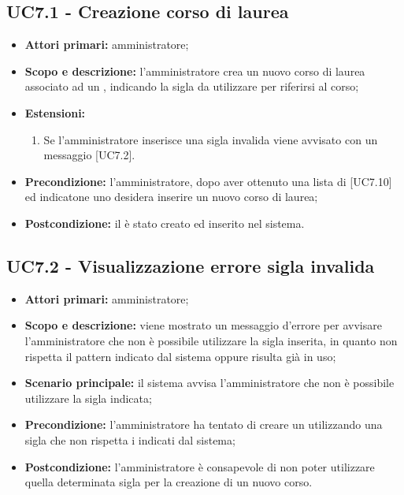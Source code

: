 \documentclass[AnalisiDeiRequisiti.tex]{subfiles}
\begin{document}
\subsection{UC7.1 - Creazione corso di laurea}
\begin{itemize}
	\item \textbf{Attori primari:} amministratore;
	\item \textbf{Scopo e descrizione:} l'amministratore crea un nuovo corso di laurea associato ad un , indicando la sigla da utilizzare per riferirsi al corso;
	\item \textbf{Estensioni:}
		\begin{enumerate}
			\item Se l'amministratore inserisce una sigla invalida viene avvisato con un messaggio [UC7.2].
		\end{enumerate}
	\item \textbf{Precondizione:} l'amministratore, dopo aver ottenuto una lista di  [UC7.10] ed indicatone uno desidera inserire un nuovo corso di laurea; 
	\item \textbf{Postcondizione:} il  è stato creato ed inserito nel sistema.
\end{itemize}
\subsection{UC7.2 - Visualizzazione errore sigla invalida}
\begin{itemize}
	\item \textbf{Attori primari:} amministratore;
	\item \textbf{Scopo e descrizione:} viene mostrato un messaggio d'errore per avvisare l'amministratore che non è possibile utilizzare la sigla inserita, in quanto non rispetta il pattern indicato dal sistema oppure risulta già in uso;
	\item \textbf{Scenario principale:} il sistema avvisa l'amministratore che non è possibile utilizzare la sigla indicata;
	\item \textbf{Precondizione:} l'amministratore ha tentato di creare un  utilizzando una sigla che non rispetta i  indicati dal sistema; 
	\item \textbf{Postcondizione:} l'amministratore è consapevole di non poter utilizzare quella determinata sigla per la creazione di un nuovo corso.
\end{itemize}
\end{document}
